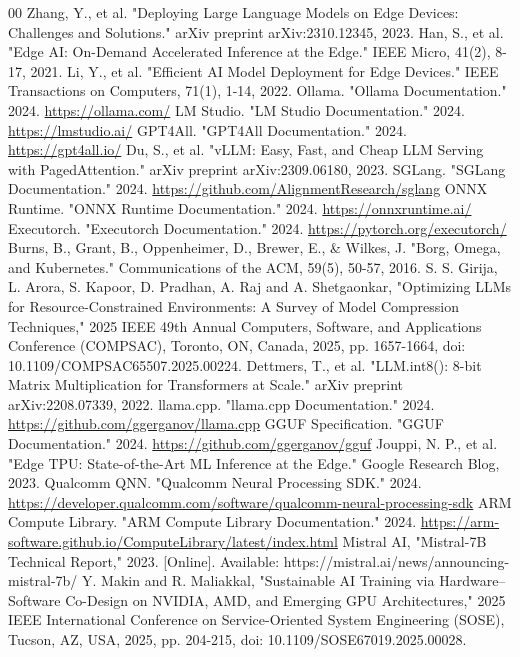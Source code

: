 \documentclass[11pt]{IEEEtran}
\begin{document}
\begin{thebibliography}{00}
 Zhang, Y., et al. "Deploying Large Language Models on Edge Devices: Challenges and Solutions." arXiv preprint arXiv:2310.12345, 2023.
 Han, S., et al. "Edge AI: On-Demand Accelerated Inference at the Edge." IEEE Micro, 41(2), 8-17, 2021.
 Li, Y., et al. "Efficient AI Model Deployment for Edge Devices." IEEE Transactions on Computers, 71(1), 1-14, 2022.
 Ollama. "Ollama Documentation." 2024. \url{https://ollama.com/}
 LM Studio. "LM Studio Documentation." 2024. \url{https://lmstudio.ai/}
 GPT4All. "GPT4All Documentation." 2024. \url{https://gpt4all.io/}
 Du, S., et al. "vLLM: Easy, Fast, and Cheap LLM Serving with PagedAttention." arXiv preprint arXiv:2309.06180, 2023.
 SGLang. "SGLang Documentation." 2024. \url{https://github.com/AlignmentResearch/sglang}
 ONNX Runtime. "ONNX Runtime Documentation." 2024. \url{https://onnxruntime.ai/}
 Executorch. "Executorch Documentation." 2024. \url{https://pytorch.org/executorch/}
 Burns, B., Grant, B., Oppenheimer, D., Brewer, E., \& Wilkes, J. "Borg, Omega, and Kubernetes." Communications of the ACM, 59(5), 50-57, 2016.
 S. S. Girija, L. Arora, S. Kapoor, D. Pradhan, A. Raj and A. Shetgaonkar, "Optimizing LLMs for Resource-Constrained Environments: A Survey of Model Compression Techniques," 2025 IEEE 49th Annual Computers, Software, and Applications Conference (COMPSAC), Toronto, ON, Canada, 2025, pp. 1657-1664, doi: 10.1109/COMPSAC65507.2025.00224.
 Dettmers, T., et al. "LLM.int8(): 8-bit Matrix Multiplication for Transformers at Scale." arXiv preprint arXiv:2208.07339, 2022.
 llama.cpp. "llama.cpp Documentation." 2024. \url{https://github.com/ggerganov/llama.cpp}
 GGUF Specification. "GGUF Documentation." 2024. \url{https://github.com/ggerganov/gguf}
 Jouppi, N. P., et al. "Edge TPU: State-of-the-Art ML Inference at the Edge." Google Research Blog, 2023.
 Qualcomm QNN. "Qualcomm Neural Processing SDK." 2024. \url{https://developer.qualcomm.com/software/qualcomm-neural-processing-sdk}
 ARM Compute Library. "ARM Compute Library Documentation." 2024. \url{https://arm-software.github.io/ComputeLibrary/latest/index.html}
 Mistral AI, "Mistral-7B Technical Report," 2023. [Online]. Available: https://mistral.ai/news/announcing-mistral-7b/
Y. Makin and R. Maliakkal, "Sustainable AI Training via Hardware–Software Co-Design on NVIDIA, AMD, and Emerging GPU Architectures," 2025 IEEE International Conference on Service-Oriented System Engineering (SOSE), Tucson, AZ, USA, 2025, pp. 204-215, doi: 10.1109/SOSE67019.2025.00028.

\end{thebibliography}
\end{document}
